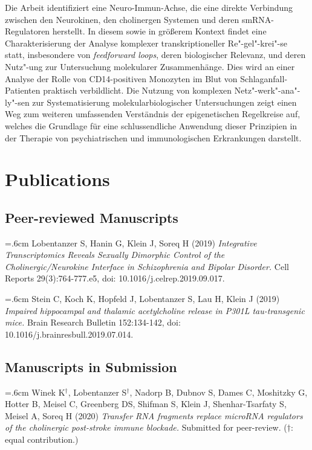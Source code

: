 Die Arbeit identifiziert eine Neuro-Immun-Achse, die eine direkte Verbindung zwischen den Neurokinen, den cholinergen Systemen und deren smRNA-Regulatoren herstellt. In diesem sowie in größerem Kontext findet eine Charakterisierung der Analyse komplexer transkriptioneller Re"-gel"-krei"-se statt, insbesondere von \emph{feedforward loops}, deren biologischer Relevanz, und deren Nutz"-ung zur Untersuchung molekularer Zusammenhänge. Dies wird an einer Analyse der Rolle von CD14-positiven Monozyten im Blut von Schlaganfall-Patienten praktisch verbildlicht. Die Nutzung von komplexen Netz"-werk"-ana"-ly"-sen zur Systematisierung molekularbiologischer Untersuchungen zeigt einen Weg zum weiteren umfassenden Verständnis der epigenetischen Regelkreise auf, welches die Grundlage für eine schlussendliche Anwendung dieser Prinzipien in der Therapie von psychiatrischen und immunologischen Erkrankungen darstellt.

\newpage

\section{Publications}

\subsection{Peer-reviewed Manuscripts}
\noindent \hangindent=.6cm Lobentanzer S, Hanin G, Klein J, Soreq H (2019) \emph{Integrative Transcriptomics Reveals Sexually Dimorphic Control of the Cholinergic/Neurokine Interface in Schizophrenia and Bipolar Disorder.} Cell Reports 29(3):764-777.e5, doi: 10.1016/j.celrep.2019.09.017.

\noindent \hangindent=.6cm Stein C, Koch K, Hopfeld J, Lobentanzer S, Lau H, Klein J (2019) \emph{Impaired hippocampal and thalamic acetylcholine release in P301L tau-transgenic mice.} Brain Research Bulletin 152:134-142, doi: 10.1016/j.brainresbull.2019.07.014.

\subsection{Manuscripts in Submission}
\noindent \hangindent=.6cm Winek K$^\dagger$, Lobentanzer S$^\dagger$, Nadorp B, Dubnov S, Dames C, Moshitzky G, Hotter B, Meisel C, Greenberg DS, Shifman S, Klein J, Shenhar-Tsarfaty S, Meisel A, Soreq H (2020) \emph{Transfer RNA fragments replace microRNA regulators of the cholinergic post-stroke immune blockade.} Submitted for peer-review. ($\dagger$: equal contribution.)

